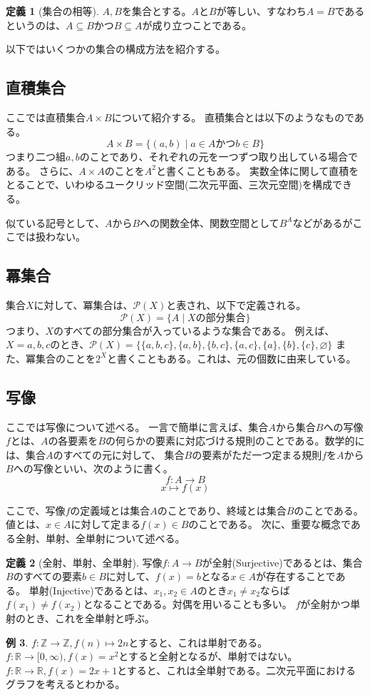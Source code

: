 \documentclass[unicode,12pt,report]{ltjsarticle}
\theoremstyle{definition}
\newtheorem{definition}{定義}[section]
\newtheorem{example}[definition]{例}
\begin{document}
\begin{definition}[集合の相等]
    $A, B$を集合とする。$A$と$B$が等しい、すなわち$A = B$であるというのは、$A \subseteq B$かつ$B \subseteq A$が成り立つことである。
\end{definition}

以下ではいくつかの集合の構成方法を紹介する。
\subsection{直積集合}
ここでは直積集合$A \times B$について紹介する。
直積集合とは以下のようなものである。
$$A \times B = \{(a, b) \mid a \in A かつ b \in B\}$$
つまり二つ組$a, b$のことであり、それぞれの元を一つずつ取り出している場合である。
さらに、$A \times A$のことを$A^2$と書くこともある。
実数全体に関して直積をとることで、いわゆるユークリッド空間(二次元平面、三次元空間)を構成できる。

似ている記号として、$A$から$B$への関数全体、関数空間として$B^A$などがあるがここでは扱わない。

\subsection{冪集合}
集合$X$に対して、冪集合は、$\mathscr{P}(X)$と表され、以下で定義される。
$$\mathscr{P}(X) = \{A \mid Xの部分集合\}$$
つまり、$X$のすべての部分集合が入っているような集合である。
例えば、$X = {a, b, c}$のとき、$\mathscr{P}(X) = \{\{a, b, c\}, \{a, b\}, \{b, c\}, \{a, c\}, \{a\}, \{b\}, \{c\}, \varnothing \}$
また、冪集合のことを$2^X$と書くこともある。これは、元の個数に由来している。

\subsection{写像}
ここでは写像について述べる。
一言で簡単に言えば、集合$A$から集合$B$への写像$f$とは、$A$の各要素を$B$の何らかの要素に対応づける規則のことである。数学的には、集合$A$のすべての元に対して、
集合$B$の要素がただ一つ定まる規則$f$を$A$から$B$への写像といい、次のように書く。$$f:A \to B$$ 
$$x \mapsto f(x)$$

ここで、写像$f$の定義域とは集合$A$のことであり、終域とは集合$B$のことである。値とは、$x \in A$に対して定まる$f(x) \in B$のことである。
次に、重要な概念である全射、単射、全単射について述べる。
\begin{definition}[全射、単射、全単射]
    写像$f:A \to B$が全射(Surjective)であるとは、集合$B$のすべての要素$b \in B$に対して、$f(x) = b$となる$x \in A$が存在することである。
    単射(Injective)であるとは、$x_1, x_2 \in A$のとき$x_1 \neq x_2$ならば$f(x_1) \neq f(x_2)$となることである。対偶を用いることも多い。
    $f$が全射かつ単射のとき、これを全単射と呼ぶ。
\end{definition}
\begin{example}
    $f:\mathbb{Z} \to \mathbb{Z}, f(n) \mapsto 2n$とすると、これは単射である。
    $f:\mathbb{R} \to [0, \infty), f(x) = x^2$とすると全射となるが、単射ではない。
    $f:\mathbb{R} \to \mathbb{R}, f(x) = 2x + 1$とすると、これは全単射である。二次元平面におけるグラフを考えるとわかる。
\end{example}
\end{document}
